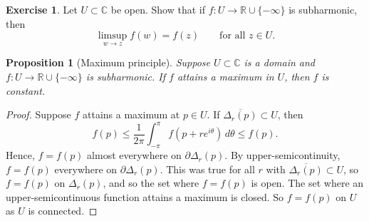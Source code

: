\documentclass[12pt,openany]{book}
\newcommand{\C}{{\mathbb{C}}}
\newcommand{\R}{{\mathbb{R}}}
\theoremstyle{plain}
\newtheorem{prop}[thm]{Proposition}
\theoremstyle{remark}
\theoremstyle{definition}
\newenvironment{exbox}{%
    \def\FrameCommand{\vrule width 1pt \relax\hspace{10pt}}%
    \MakeFramed{\advance\hsize-\width\FrameRestore}%
}{%
    \endMakeFramed
}
\theoremstyle{exercise}
\newtheorem{exercise}{Exercise}[section]
\theoremstyle{example}
\begin{document}
\begin{exbox}
\begin{exercise}
Let $U \subset \C$ be open.
Show that if $f \colon U \to \R \cup\{- \infty \}$ is subharmonic,
then 
\begin{equation*}
\limsup_{w \to z} f(w) = f(z) 
\qquad \text{for all $z \in U$.}
\end{equation*}
\end{exercise}
\end{exbox}

\begin{prop}[Maximum principle]
Suppose $U \subset \C$ is a domain and $f \colon U \to \R \cup \{ -\infty \}$
is subharmonic.  If $f$ attains a maximum in $U$, then $f$ is constant.
\end{prop}

\begin{proof}
Suppose $f$ attains a maximum at $p \in U$.
If
$\overline{\Delta_r(p)} \subset U$, then
\begin{equation*}
f(p) \leq \frac{1}{2\pi} \int_{-\pi}^{\pi} f(p+re^{i\theta})\, d\theta \leq f(p)
.
\end{equation*}
Hence, $f = f(p)$ almost everywhere on $\partial \Delta_r(p)$.
By upper-semicontinuity, $f = f(p)$ everywhere on $\partial \Delta_r(p)$.
This was true for all $r$
with $\overline{\Delta_r(p)} \subset U$, so $f=f(p)$ on $\Delta_r(p)$,
and so the set where $f=f(p)$ is open.  The set where an upper-semicontinuous
function attains a maximum is closed.  So $f=f(p)$ on $U$ as $U$ is
connected.
\end{proof}
\end{document}
